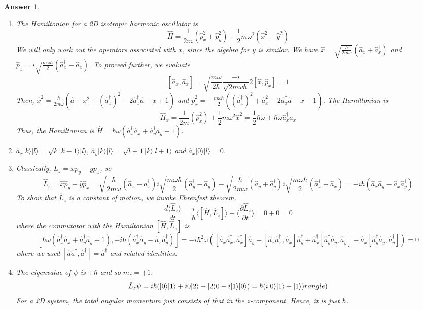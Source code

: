 \documentclass[a4paper]{article}
\newtheorem{ans}{Answer}[subsection]
\theoremstyle{new}
\begin{document}
\begin{ans}\leavevmode
\begin{enumerate}[label=(\roman*)]
\item The Hamiltonian for a 2D isotropic harmonic oscillator is
$$\hat{H}=\frac{1}{2m}
(\hat{p}_x^2+\hat{p}_y^2)+\frac{1}{2}m\omega^2(\hat{x}^2+\hat{y}^2)$$
We will only work out the operators associated with $x$, since the algebra for $y$ is similar. We have $\hat{x}=\sqrt{\frac{\hbar}{2m\omega}}(\hat{a}_x+\hat{a}_x^\dag)$ and $\hat{p}_x=i\sqrt{\frac{m\omega\hbar}{2}}(\hat{a}_x^\dag-\hat{a}_x)$. To proceed further, we evaluate
$$[\hat{a}_x,\hat{a}_x^\dag]=\sqrt{\frac{m\omega}{2\hbar}}\frac{-i}{\sqrt{2m\omega\hbar}}2[\hat{x},\hat{p}_x]=1$$
Then, $\hat{x}^2=\frac{\hbar}{2m\omega}(\hat{a}-x^2+(\hat{a}_x^\dag)^2+2\hat{a}_x^\dag\hat{a}-x+1)$ and $\hat{p}_x^2=-\frac{m\omega\hbar}{2}((\hat{a}_x^\dag)^2+\hat{a}_x^2-2\hat{a}_x^\dag\hat{a}-x-1)$. The Hamiltonian is
$$\hat{H}_x=\frac{1}{2m}(\hat{p}_x^2)+\frac{1}{2}m\omega^2\hat{x}^2=\frac{1}{2}\hbar\omega+\hbar\omega\hat{a}_x^\dag\hat{a}_x$$
Thus, the Hamiltonian is $\hat{H}=\hbar\omega(\hat{a}_x^\dag\hat{a}_x+\hat{a}_y^\dag\hat{a}_y+1)$.
\item $\hat{a}_x|k\rangle|l\rangle=\sqrt{k}|k-1\rangle|l\rangle$, $\hat{a}_y^\dag|k\rangle|l\rangle=\sqrt{l+1}|k\rangle|l+1\rangle$ and $\hat{a}_x|0\rangle|l\rangle=0$.
\item Classically, $L_z=xp_y-yp_x$, so
$$\hat{L}_z=\hat{x}\hat{p}_y-\hat{y}\hat{p}_x=\sqrt{\frac{\hbar}{2m\omega}}(\hat{a}_x+\hat{a}_x^\dag)i\sqrt{\frac{m\omega\hbar}{2}}(\hat{a}_y^\dag-\hat{a}_y)-\sqrt{\frac{\hbar}{2m\omega}}(\hat{a}_y+\hat{a}_y^\dag)i\sqrt{\frac{m\omega\hbar}{2}}(\hat{a}_x^\dag-\hat{a}_x)=-i\hbar(\hat{a}_x^\dag\hat{a}_y-\hat{a}_x\hat{a}_y^\dag)$$
To show that $\hat{L}_z$ is a constant of motion, we invoke Ehrenfest theorem.
$$\frac{d\langle\hat{L}_z\rangle}{dt}=\frac{i}{\hbar}\langle[\hat{H},\hat{L}_z]\rangle+\bigg\langle\frac{\partial\hat{L}_z}{\partial t}\bigg\rangle=0+0=0$$
where the commutator with the Hamiltonian $[\hat{H},\hat{L}_z]$ is
$$[\hbar\omega(\hat{a}_x^\dag\hat{a}_x+\hat{a}_y^\dag\hat{a}_y+1),-i\hbar(\hat{a}_x^\dag\hat{a}_y-\hat{a}_x\hat{a}_y^\dag)]=-i\hbar^2\omega([\hat{a}_x\hat{a}_x^\dag,\hat{a}_x^\dag]\hat{a}_y-[\hat{a}_x\hat{a}_x^\dag,\hat{a}_x]\hat{a}_y^\dag+\hat{a}_x^\dag[\hat{a}_y^\dag\hat{a}_y,\hat{a}_y]-\hat{a}_x[\hat{a}_y^\dag\hat{a}_y,\hat{a}_y^\dag])=0$$
where we used $[\hat{a}\hat{a}^\dag,\hat{a}^\dag]=\hat{a}^\dag$ and related identities.
\item The eigenvalue of $\psi$ is $+\hbar$ and so $m_z=+1$.
$$\hat{L}_z\psi=i\hbar(|0\rangle|1\rangle+i0|2\rangle-|2\rangle0-i|1\rangle|0\rangle)=\hbar(i|0\rangle|1\rangle+|1\rangle)\\rangle)$$
For a 2D system, the total angular momentum just consists of that in the $z$-component. Hence, it is just $\hbar$.
\end{enumerate}
\end{ans}
\end{document}
